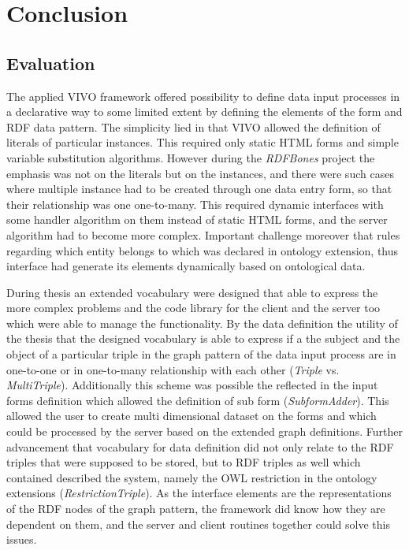 

\chapter{Conclusion}

\section{Evaluation}

The applied VIVO framework offered possibility to define data input processes in a declarative way to some limited extent by defining the elements of the form and RDF data pattern. The simplicity lied in that VIVO allowed the definition of literals of particular instances. This required only static HTML forms and simple variable substitution algorithms. However during the \textit{RDFBones} project the emphasis was not on the literals but on the instances, and there were such cases where multiple instance had to be created through one data entry form, so that their relationship was one one-to-many. This required dynamic interfaces with some handler algorithm on them instead of static HTML forms, and the server algorithm had to become more complex. Important challenge moreover that rules regarding which entity belongs to which was declared in ontology extension, thus interface had generate its elements dynamically based on ontological data.

During thesis an extended vocabulary were designed that able to express the more complex problems and the code library for the client and the server too which were able to manage the functionality. By the data definition the utility of the thesis that the designed vocabulary is able to express if a the subject and the object of a particular triple in the graph pattern of the data input process are in one-to-one or in one-to-many relationship with each other (\textit{Triple} vs. \textit{MultiTriple}). Additionally this scheme was possible the reflected in the input forms definition which allowed the definition of sub form (\textit{SubformAdder}). This allowed the user to create multi dimensional dataset on the forms and which could be processed by the server based on the extended graph definitions. Further advancement that vocabulary for data definition did not only relate to the RDF triples that were supposed to be stored, but to RDF triples as well which contained described the system, namely the OWL restriction in the ontology extensions (\textit{RestrictionTriple}). As the interface elements are the representations of the RDF nodes of the graph pattern, the framework did know how they are dependent on them, and the server and client routines together could solve this issues.

